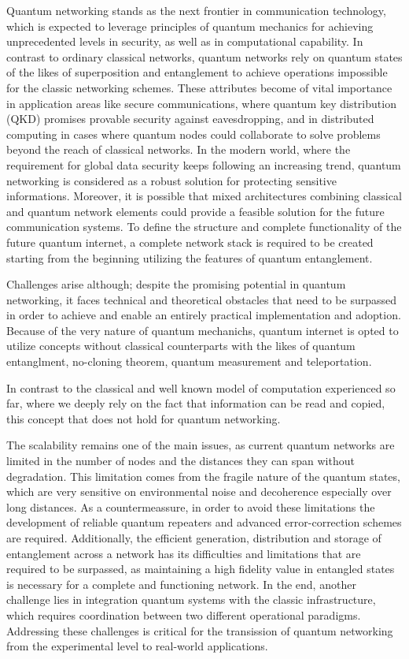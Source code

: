 \documentclass[12pt,a4paper] {report}
\begin{document}
		Quantum networking stands as the next frontier in communication technology,
		which is expected to leverage principles of quantum mechanics for
		achieving unprecedented levels in security, as well as in computational capability.
		In contrast to ordinary classical networks, quantum networks rely on quantum states
		of the likes of superposition and entanglement to achieve operations impossible for
	        the classic networking schemes. These attributes become of vital importance in 
		application areas like secure communications, where quantum key distribution (QKD) 
		promises provable security against eavesdropping, and in distributed computing in cases 
		where quantum nodes could collaborate to solve problems beyond the reach of classical networks.
		In the modern world, where the requirement for global data security keeps following
		an increasing trend, quantum networking is considered as a robust solution
		for protecting sensitive informations.
		Moreover, it is possible that mixed architectures combining classical and quantum network elements
		could provide a feasible solution for the future communication systems. 
		To define the structure and complete functionality of the future quantum internet,
		a complete network stack is required to be created starting from the beginning utilizing 
		the features of quantum entanglement\cite{rfc}.

		Challenges arise although; despite the promising potential in quantum networking,
		it faces technical and theoretical obstacles that need to be surpassed
		in order to achieve and enable an entirely practical implementation and adoption.
		Because of the very nature of quantum mechanichs, quantum internet is opted to utilize concepts
		without classical counterparts with the likes of quantum entanglment,
		no-cloning theorem, quantum measurement and teleportation.
		
		In contrast to the classical and well known model of computation experienced so far,
		where we deeply rely on the fact that information can be read and copied, this concept that does not hold
		for quantum networking. 
		
		The scalability remains one of the main issues,
		as current quantum networks are limited in the number of nodes and the
		distances they can span without degradation.
		This limitation comes from the fragile nature of the quantum states,
		which are very sensitive on environmental noise and decoherence especially over long distances.
		As a countermeassure, in order to avoid these limitations the development of reliable quantum repeaters
		and advanced error-correction schemes are required.	
		Additionally, the efficient generation, distribution and storage of entanglement 
		across a network has its difficulties and limitations that are required to be surpassed, 
		as maintaining a high fidelity value in entangled
		states is necessary for a complete and functioning network.
		In the end, another challenge lies in integration
	        quantum systems with the classic infrastructure,
	        which requires coordination between
	        two different operational paradigms.
	        Addressing these challenges is critical for the transission of 
		quantum networking from the experimental level to real-world applications.
\end{document}
